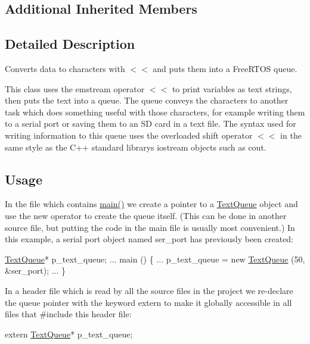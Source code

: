 \subsection*{Additional Inherited Members}


\subsection{Detailed Description}
Converts data to characters with {\ttfamily $<$$<$} and puts them into a Free\+R\+T\+OS queue. 

This class uses the {\ttfamily emstream} operator {\ttfamily $<$$<$} to print variables as text strings, then puts the text into a queue. The queue conveys the characters to another task which does something useful with those characters, for example writing them to a serial port or saving them to an SD card in a text file. The syntax used for writing information to this queue uses the overloaded shift operator {\ttfamily $<$$<$} in the same style as the C++ standard library\textquotesingle{}s {\ttfamily iostream} objects such as {\ttfamily cout}.\hypertarget{index_Usage}{}\subsection{Usage}\label{index_Usage}
In the file which contains {\ttfamily \mbox{\hyperlink{main_8cpp_a840291bc02cba5474a4cb46a9b9566fe}{main()}}} we create a pointer to a {\ttfamily \mbox{\hyperlink{class_text_queue}{Text\+Queue}}} object and use the {\ttfamily new} operator to create the queue itself. (This can be done in another source file, but putting the code in the main file is usually most convenient.) In this example, a serial port object named {\ttfamily ser\+\_\+port} has previously been created\+: 
\begin{DoxyCode}
\mbox{\hyperlink{class_text_queue}{TextQueue}}* p\_text\_queue;
...
main ()
\{
    ...
    p\_text\_queue = \textcolor{keyword}{new} \mbox{\hyperlink{class_text_queue_a2823917efdf4439cc4f70456b8ddf4bd}{TextQueue}} (50, &ser\_port);
    ...
\}
\end{DoxyCode}
 In a header file which is read by all the source files in the project we re-\/declare the queue pointer with the keyword {\ttfamily extern} to make it globally accessible in all files that {\ttfamily \#include} this header file\+: 
\begin{DoxyCode}
\textcolor{keyword}{extern} \mbox{\hyperlink{class_text_queue}{TextQueue}}* p\_text\_queue;
\end{DoxyCode}
